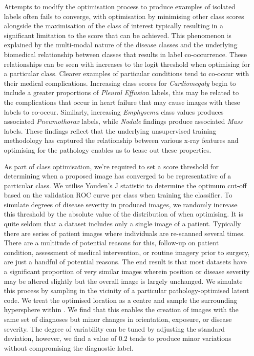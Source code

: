 \documentclass{article}
\begin{document}
Attempts to modify the optimisation process to produce examples of isolated labels often fails to converge, with optimisation by minimising other class scores alongside the maximisation of the class of interest typically resulting in a significant limitation to the score that can be achieved. This phenomenon is explained by the multi-modal nature of the disease classes and the underlying biomedical relationship between classes that results in label co-occurrence. These relationships can be seen with increases to the logit threshold when optimising for a particular class. Clearer examples of particular conditions tend to co-occur with their medical complications. Increasing class scores for \emph{Cardiomegaly} begin to include a greater proportions of \emph{Pleural Effusion} labels, this may be related to the complications that occur in heart failure that may cause images with these labels to co-occur. Similarly, increasing \emph{Emphysema} class values produces associated \emph{Pneumothorax} labels, while \emph{Nodule} findings produce associated \emph{Mass} labels. These findings reflect that the underlying unsupervised training methodology has captured the relationship between various x-ray features and optimising for the pathology enables us to tease out these properties.

As part of class optimisation, we're required to set a score threshold for determining when a proposed image has converged to be representative of a particular class. We utilise Youden's J statistic to determine the optimum cut-off based on the validation ROC curve per class when training the classifier. To simulate degrees of disease severity in produced images, we randomly increase this threshold by the absolute value of the distribution of  when optimising. It is quite seldom that a dataset includes only a single image of a patient. Typically there are series of patient images where individuals are re-scanned several times. There are a multitude of potential reasons for this, follow-up on patient condition, assessment of medical intervention, or routine imagery prior to surgery, are just a handful of potential reasons. The end result is that most datasets have a significant proportion of very similar images wherein position or disease severity may be altered slightly but the overall image is largely unchanged. We simulate this process by sampling in the vicinity of a particular pathology-optimised latent code. We treat the optimised location as a centre and sample the surrounding hypersphere within . We find that this enables the creation of images with the same set of diagnoses but minor changes in orientation, exposure, or disease severity. The degree of variability can be tuned by adjusting the standard deviation, however, we find a value of \num{0.2} tends to produce minor variations without compromising the diagnostic label.
\end{document}
